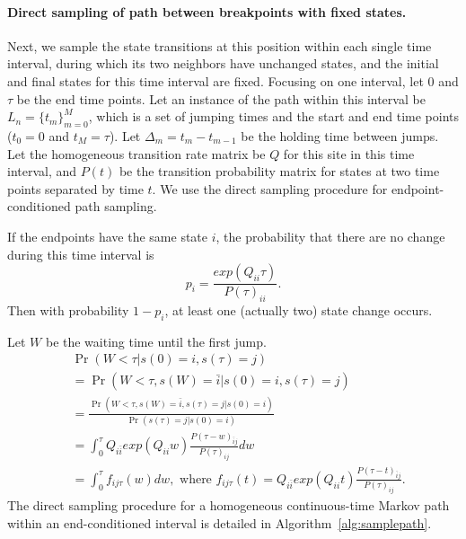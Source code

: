 \documentclass[11pt]{article}
\begin{document}
\paragraph{Direct sampling of path between breakpoints with fixed states.}
Next, we sample the state transitions at this position within each
single time interval, during which its two neighbors have unchanged
states, and the initial and final states for this time interval are
fixed.  Focusing on one interval, let $0$ and $\tau$ be the end time
points.  Let an instance of the path within this interval be $L_n =
\{t_m\}_{m=0}^{M}$, which is a set of jumping times and the start and
end time points ($t_0 = 0$ and $t_M=\tau$). Let $\Delta_m = t_m -
t_{m-1}$ be the holding time between jumps. Let the homogeneous
transition rate matrix be $Q$ for this site in this time interval, and
$P(t)$ be the transition probability matrix for states at two time
points separated by time $t$. We use the direct sampling procedure
\cite{hobolth2009simulation} for endpoint-conditioned path sampling.

If the endpoints have the same state $i$, the probability that there
are no change during this time interval is 
\begin{equation} \label{eqn:pnojump}
p_i = \frac{exp(Q_{ii}\tau)}{P(\tau)_{ii}}.
\end{equation}
Then with probability $1-p_i$, at least one (actually two) state change occurs. 

Let $W$ be the waiting time until the first jump. 
\begin{equation}
\begin{aligned}
& \Pr(W < \tau | s(0) = i, s(\tau) = j)  \\
& =  \Pr(W < \tau, s(W) = \bar{i} | s(0) = i, s(\tau) = j)\\
& = \frac{\Pr(W < \tau, s(W) = \bar{i},s(\tau) = j | s(0) = i) } {\Pr(s(\tau) = j | s(0) = i)}  \\
& = \int_{0}^{\tau} Q_{i\bar{i}} exp(Q_{ii}w) \frac{P(\tau-w)_{\bar{i}j}}{P(\tau)_{ij}} dw \\
& = \int_{0}^{\tau} f_{ij\tau}(w) dw, \text{~where~} 
f_{ij\tau}(t) = Q_{i\bar{i}} exp(Q_{ii}t) \frac{P(\tau-t)_{\bar{i}j}}{P(\tau)_{ij}}. 
\end{aligned}
\end{equation}
The direct sampling procedure for a homogeneous continuous-time Markov path within an end-conditioned interval is detailed in Algorithm~\ref{alg:samplepath}.
\end{document}
